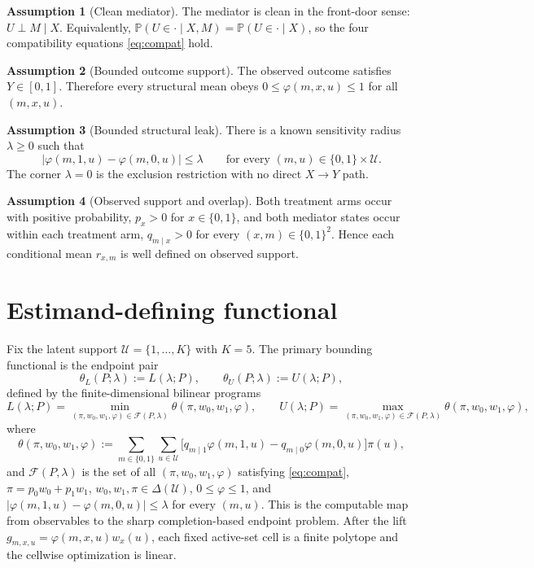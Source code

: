 \documentclass[11pt]{article}
\renewcommand{\Pr}{\mathbb{P}}
\theoremstyle{definition}
\newtheorem{assumption}{Assumption}
\theoremstyle{plain}
\theoremstyle{remark}
\begin{document}
\begin{assumption}[Clean mediator]\label{ass:clean}
The mediator is clean in the front-door sense: \(U\perp M\mid X\). Equivalently,
\(\Pr(U\in\cdot\mid X,M)=\Pr(U\in\cdot\mid X)\), so the four compatibility equations
\eqref{eq:compat} hold.
\end{assumption}

\begin{assumption}[Bounded outcome support]\label{ass:bounded}
The observed outcome satisfies \(Y\in[0,1]\). Therefore every structural mean obeys
\(0\le \varphi(m,x,u)\le 1\) for all \((m,x,u)\).
\end{assumption}

\begin{assumption}[Bounded structural leak]\label{ass:leak}
There is a known sensitivity radius \(\lambda\ge 0\) such that
\[
  |\varphi(m,1,u)-\varphi(m,0,u)|\le \lambda
  \qquad\text{for every }(m,u)\in\{0,1\}\times\mathcal U.
\]
The corner \(\lambda=0\) is the exclusion restriction with no direct \(X\to Y\) path.
\end{assumption}

\begin{assumption}[Observed support and overlap]\label{ass:overlap}
Both treatment arms occur with positive probability, \(p_x>0\) for \(x\in\{0,1\}\),
and both mediator states occur within each treatment arm,
\(q_{m\mid x}>0\) for every \((x,m)\in\{0,1\}^2\). Hence each conditional mean
\(r_{x,m}\) is well defined on observed support.
\end{assumption}

\section{Estimand-defining functional}
Fix the latent support \(\mathcal U=\{1,\dots,K\}\) with \(K=5\). The primary
bounding functional is the endpoint pair
\[
  \theta_L(P;\lambda):=L(\lambda;P),\qquad \theta_U(P;\lambda):=U(\lambda;P),
\]
defined by the finite-dimensional bilinear programs
\[
  L(\lambda;P)=\min_{(\pi,w_0,w_1,\varphi)\in\mathcal F(P,\lambda)} \theta(\pi,w_0,w_1,\varphi),
  \qquad
  U(\lambda;P)=\max_{(\pi,w_0,w_1,\varphi)\in\mathcal F(P,\lambda)} \theta(\pi,w_0,w_1,\varphi),
\]
where
\[
  \theta(\pi,w_0,w_1,\varphi)
  :=\sum_{m\in\{0,1\}}\sum_{u\in\mathcal U}
    \bigl[q_{m\mid1}\varphi(m,1,u)-q_{m\mid0}\varphi(m,0,u)\bigr]\pi(u),
\]
and \(\mathcal F(P,\lambda)\) is the set of all \((\pi,w_0,w_1,\varphi)\) satisfying
\eqref{eq:compat}, \(\pi=p_0w_0+p_1w_1\), \(w_0,w_1,\pi\in\Delta(\mathcal U)\),
\(0\le \varphi\le 1\), and \(|\varphi(m,1,u)-\varphi(m,0,u)|\le \lambda\) for every
\((m,u)\). This is the computable map from observables to the sharp completion-based
endpoint problem. After the lift \(g_{m,x,u}=\varphi(m,x,u)w_x(u)\), each fixed
active-set cell is a finite polytope and the cellwise optimization is linear.
\end{document}
